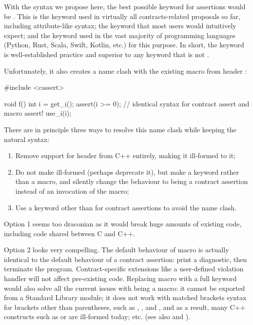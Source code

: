 With the syntax we propose here, the best possible keyword for assertions would be . This is the keyword used in virtually all contracts-related proposals so far, including attribute-like syntax; the keyword that most users would intuitively expect; and the keyword used in the vast majority of programming languages (Python, Rust, Scala, Swift, Kotlin, etc.) for this purpose. In short, the keyword  is well-established practice and superior to any keyword that is not .

Unfortunately, it also creates a name clash with the existing  macro from header :

\begin{codeblock}
#include <cassert> 

void f() {
  int i = get_i();
  assert(i >= 0);  // identical syntax for contract assert and macro assert!
  use_i(i);
}
\end{codeblock}

There are in principle three ways to resolve this name clash while keeping the natural syntax:
\begin{enumerate}
\item Remove support for header  from C++ entirely, making it ill-formed to  it;
\item Do not make  ill-formed (perhaps deprecate it), but make  a keyword rather than a macro, and silently change the behaviour to being a contract assertion instead of an invocation of the macro;
\item Use a keyword other than  for contract assertions to avoid the name clash.
\end{enumerate}
Option 1 seems too draconian as it would break huge amounts of existing code, including code shared between C and C++.

Option 2 looks very compelling. The default behaviour of macro  is actually identical to the default behaviour of a contract assertion: print a diagnostic, then terminate the program. Contract-specific extensions like a user-defined violation handler will not affect pre-existing code. Replacing macro  with a full keyword would also solve all the current issues with  being a macro: it cannot be exported from a Standard Library module; it does not work with matched brackets syntax for brackets other than parentheses, such as , , and \tcode{[...]}, and as a result, many C++ constructs such as  or  are ill-formed today; etc. (see also \cite{P2264R5} and \cite{P2884R0}).

